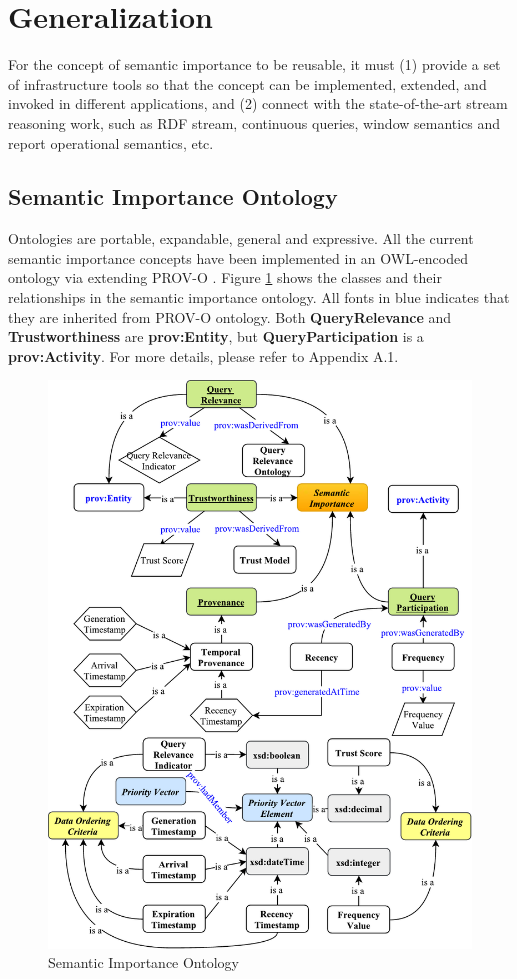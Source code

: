 \section{Generalization}
For the concept of semantic importance to be reusable, it must 
(1) provide a set of infrastructure tools so that the concept can be implemented, extended, and invoked in different applications, 
and (2) connect with the state-of-the-art stream reasoning work, such as RDF stream, continuous queries, window semantics and report operational semantics, etc.
%
\subsection{Semantic Importance Ontology}
Ontologies are portable, expandable, general and expressive.
All the current semantic importance concepts have been implemented in an OWL-encoded ontology via extending PROV-O \cite{lebo2013prov}.
Figure \ref{fig:6-sicr} shows the classes and their relationships in the semantic importance ontology. 
All fonts in blue indicates that they are inherited from PROV-O ontology. 
Both \textbf{QueryRelevance} and \textbf{Trustworthiness} are \textbf{prov:Entity}, but \textbf{QueryParticipation} is a \textbf{prov:Activity}.
For more details, please refer to Appendix A.1. 

\begin{figure}[!htbp]
    \centering
    \includegraphics[width=5in]{img/6-sicr.pdf}
    \caption{Semantic Importance Ontology}
    \label{fig:6-sicr}
\end{figure}
%

